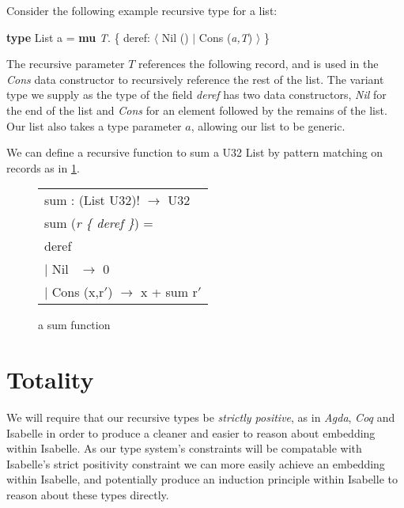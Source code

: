 Consider the following example recursive type for a list:
\begin{center}
    \textbf{type} List a = \textbf{mu} \textit{T}. \{ deref: $\langle$ Nil () $\vert$ Cons (\textit{a,T}) $\rangle$ \}
\end{center}

The recursive parameter $T$ references the following record, and is used in the \textit{Cons} data constructor
to recursively reference the rest of the list.
The variant type  we supply as the type of the field
\textit{deref} has two data constructors, \textit{Nil} for the end of the list and \textit{Cons} for an element
followed by the remains of the list. Our list also takes a type parameter $a$, allowing our list to be generic.

We can define a recursive function to sum a U32 List by pattern matching on records as 
in \ref{fig:sum}.

\begin{figure}%
    \begin{center}
        \begin{tabular}{l}
            sum : (List U32)! $\rightarrow$ U32 \\
            sum (\textit{r \{ deref \}}) = \\
            \hspace{0.8em} deref \\
                \hspace{2em} $\vert$ Nil  \quad\quad\quad$\,$   $\rightarrow$ 0 \\
                \hspace{2em} $\vert$ Cons (x,r$'$)  $\rightarrow$ x + sum r$'$
        \end{tabular}
    \end{center}
    \caption[short]{a sum function}
    \label{fig:sum}
\end{figure}


\section{Totality}

We will require that our recursive types be \textit{strictly positive}, as in \textit{Agda},
\textit{Coq} and Isabelle in order to produce a cleaner and easier to reason about
embedding within Isabelle. As our type system's constraints will be compatable with Isabelle's
strict positivity constraint we can more easily achieve an embedding within Isabelle, and potentially
produce an induction principle within Isabelle to reason about these types directly.



